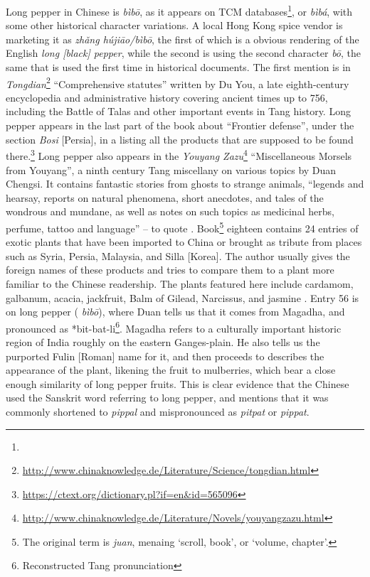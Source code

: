 Long pepper in Chinese is  \textit{bìbō}, as it appears on TCM databases\footnote{}, or  \textit{bìbá}, with some other historical character variations. A local Hong Kong spice vendor is marketing it as  \textit{zhǎng hújiāo/bìbō}, the first of which is a obvious rendering of the English \textit{long [black] pepper}, while the second is using the second character  \textit{bō}, the same that is used the first time in historical documents. The first mention is in  \textit{Tongdian}\footnote{\url{http://www.chinaknowledge.de/Literature/Science/tongdian.html}} ``Comprehensive statutes'' written by Du You, a late eighth-century encyclopedia and administrative history covering ancient times up to 756, including the Battle of Talas and other important events in Tang history. Long pepper appears in the last part of the book about ``Frontier defense'', under the section  \textit{Bosi} [Persia], in a listing all the products that are supposed to be found there.\footnote{\url{https://ctext.org/dictionary.pl?if=en&id=565096}} Long pepper also appears in the  \textit{Youyang Zazu}\footnote{\url{http://www.chinaknowledge.de/Literature/Novels/youyangzazu.html}} ``Miscellaneous Morsels from Youyang'', a ninth century Tang miscellany on various topics by Duan Chengsi. It contains fantastic stories from ghosts to strange animals, ``legends and hearsay, reports on natural phenomena, short anecdotes, and tales of the wondrous and mundane, as well as notes on such topics as medicinal herbs, perfume, tattoo and language'' -- to quote \textcite[1]{reed_youyang_1995}. Book\footnote{The original term is  \textit{juan}, menaing `scroll, book', or `volume, chapter'.} eighteen contains 24 entries of exotic plants that have been imported to China or brought as tribute from places such as Syria, Persia, Malaysia, and Silla [Korea]. The author usually gives the foreign names of these products and tries to compare them to a plant more familiar to the Chinese readership. The plants featured here include cardamom, galbanum, acacia, jackfruit, Balm of Gilead, Narcissus, and jasmine \autocite[68]{reed_youyang_1995}. Entry 56 is on long pepper ( \textit{bìbō}), where Duan tells us that it comes from Magadha, and pronounced as  *bit-bat-li\footnote{Reconstructed Tang pronunciation}. Magadha refers to a culturally important historic region of India roughly on the eastern Ganges-plain. He also tells us the purported Fulin [Roman] name for it, and then proceeds to describes the appearance of the plant, likening the fruit to mulberries, which bear a close enough similarity of long pepper fruits. This is clear evidence that the Chinese used the Sanskrit word referring to long pepper, and \textcite[151]{schafer_golden_1985} mentions that it was commonly shortened to \textit{pippal} and mispronounced as \textit{pitpat} or \textit{pippat}. 

